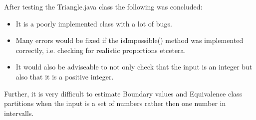 After testing the Triangle.java class the following was concluded:
\begin{itemize}
	\item It is a poorly implemented class with a lot of bugs.
	\item Many errors would be fixed if the isImpossible() method was implemented correctly, i.e. checking for realistic proportions etcetera.
	\item It would also be adviseable to not only check that the input is an integer but also that it is a positive integer.
\end{itemize}

Further, it is very difficult to estimate Boundary values and Equivalence class partitions when the input is a set of numbers rather then one number in intervalls. 